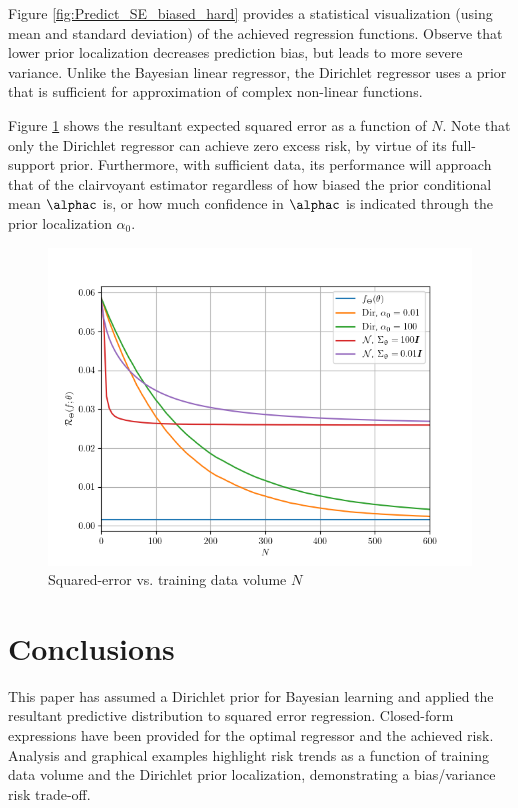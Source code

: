 \documentclass{article}
\begin{document}
	Figure \ref{fig:Predict_SE_biased_hard} provides a statistical visualization (using mean and standard deviation) of the achieved regression functions. Observe that lower prior localization decreases prediction bias, but leads to more severe variance. Unlike the Bayesian linear regressor, the Dirichlet regressor uses a prior that is sufficient for approximation of complex non-linear functions.
	
	
	Figure \ref{fig:Risk_cond_SE_N_biased_hard} shows the resultant expected squared error as a function of $N$. Note that only the Dirichlet regressor can achieve zero excess risk, by virtue of its full-support prior. Furthermore, with sufficient data, its performance will approach that of the clairvoyant estimator regardless of how biased the prior conditional mean $\alphac$ is, or how much confidence in $\alphac$ is indicated through the prior localization $\alpha_0$.
	\begin{figure}
		\centering
		\includegraphics[width=1\linewidth]{SSP_2021/Risk_cond_SE_N_biased_hard.png}
		\caption{Squared-error vs. training data volume $N$}
		\label{fig:Risk_cond_SE_N_biased_hard}
	\end{figure}
	
	
	
	
	
	\section{Conclusions}
	
	This paper has assumed a Dirichlet prior for Bayesian learning and applied the resultant predictive distribution to squared error regression. Closed-form expressions have been provided for the optimal regressor and the achieved risk. Analysis and graphical examples highlight risk trends as a function of training data volume and the Dirichlet prior localization, demonstrating a bias/variance risk trade-off.
	
\end{document}
